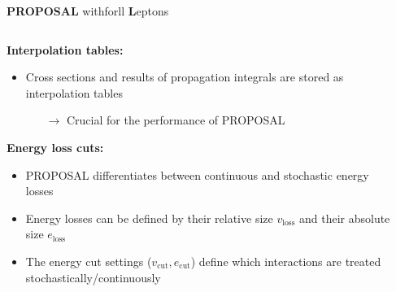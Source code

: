 \begin{frame}{}
  \vspace{-3cm}
  \begin{minipage}[t][1cm][t]{\textwidth}
  {\huge \textbf{PROPOSAL}} {\huge\textbf{\rightarrow}}
  \colorbox{tugreen}{}{\Large with}\colorbox{tugreen}{}{\Large for}\colorbox{tugreen}{ll {\huge \textbf{L}}{\Large eptons}}
  \end{minipage}
  \begin{minipage}[t][1cm][t]{\textwidth}
    \begin{columns}[onlytextwidth]
        \begin{column}{0.5\textwidth}
          \textbf{Interpolation tables:}
            \begin{itemize}
              \item Cross sections and results of propagation integrals are stored as interpolation tables
              \begin{itemize}
                \item[$\rightarrow$] Crucial for the performance of PROPOSAL
              \end{itemize}
            \end{itemize}
          \textbf{Energy loss cuts:}
          \begin{itemize}
            \item PROPOSAL differentiates between continuous and stochastic energy losses
            \item Energy losses can be defined by their relative size $v_\text{loss}$ and their absolute size $e_\text{loss}$
            \item The energy cut settings ($v_\text{cut}, e_\text{cut}$) define which interactions are treated stochastically/continuously
          \end{itemize}
        \end{column}
        \begin{column}{0.5\textwidth}


\end{column}
\end{columns}
\end{minipage}
\end{frame}
